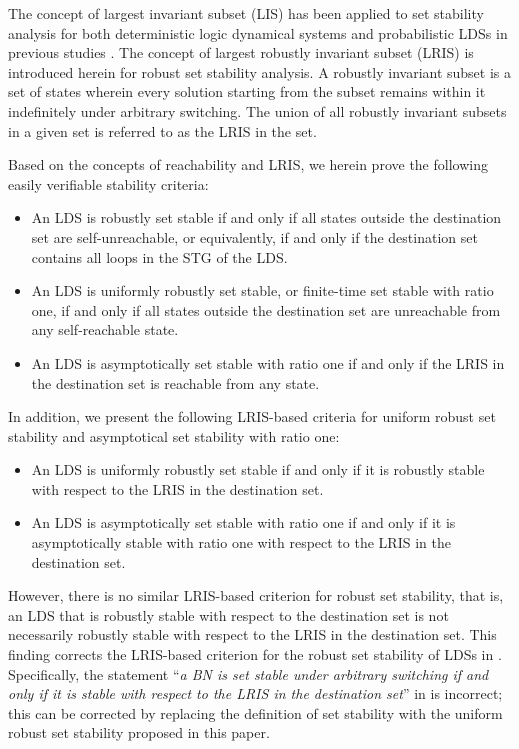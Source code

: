 \documentclass[11pt,onecolumn]{article}
\begin{document}
 The concept of largest invariant subset (LIS) has been applied to set stability analysis for both deterministic logic dynamical systems and probabilistic LDSs in previous studies \cite{Guo2015Set,Guo2019Stability}. The concept of largest robustly invariant subset (LRIS) is introduced herein for robust set stability analysis. A robustly invariant subset is a set of states wherein every solution starting from the subset remains within it indefinitely under arbitrary switching. The union of all robustly invariant subsets in a given set is referred to as the LRIS in the set.



 Based on the concepts of reachability and LRIS, we herein prove the following easily verifiable stability criteria:
 \begin{itemize}
   \item An LDS is robustly set stable if and only if all states outside the destination set are self-unreachable, or equivalently, if and only if the destination set contains all loops in the STG of the LDS.
   \item An LDS is uniformly robustly set stable, or finite-time set stable with ratio one, if and only if all states outside the destination set are unreachable from any self-reachable state.
   \item An LDS is asymptotically set stable with ratio one if and only if the LRIS in the destination set is reachable from any state.
 \end{itemize}

In addition, we present the following LRIS-based criteria for uniform robust set stability and asymptotical set stability with ratio one:
\begin{itemize}
  \item An LDS is uniformly robustly set stable if and only if it is robustly stable with respect to the LRIS in the destination set.
  \item An LDS is asymptotically set stable with ratio one if and only if it is asymptotically stable with ratio one with respect to the LRIS in the destination set.
\end{itemize}
However, there is no similar LRIS-based criterion for robust set stability, that is, an LDS that is robustly stable with respect to the destination set is not necessarily robustly stable with respect to the LRIS in the destination set.
This finding corrects the LRIS-based criterion for the robust set stability of LDSs in \cite{Guo2017Invariant}. Specifically, the statement ``\textit{a BN is set stable under arbitrary switching if and only if it is stable with respect to the LRIS in the destination set}'' in \cite{Guo2017Invariant} is incorrect; this can be corrected by replacing the definition of set stability with the uniform robust set stability proposed in this paper.
\end{document}
